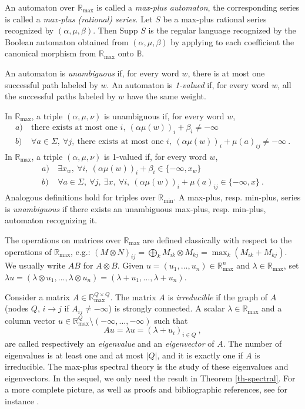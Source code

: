 \documentclass{article}
\newcommand{\supp}[1]{\text{Supp }#1}
\newcommand{\R} {\ensuremath{\mathbb{R}}}
\newcommand{\B} {\ensuremath{\mathbb{B}}}
\newcommand{\Rmin} {\R_{\min}}
\newcommand{\Rmax} {\R_{\max}}
\newcommand{\1}{\mathbb{1}}
\newcommand{\0}{\mathbb{0}}
\begin{document}
\medskip

An automaton over $\Rmax$ is called a {\em max-plus
automaton}, the corresponding series is called a {\em max-plus
(rational) series}.
Let $S$ be a max-plus
  rational series recognized by
$(\alpha,\mu,\beta)$. Then $\supp S$ is the regular language 
recognized
by the Boolean automaton obtained from $(\alpha,\mu,\beta)$ by
applying to each coefficient the canonical morphism from $\Rmax$ onto
$\B$. 

\medskip

An automaton is {\em unambiguous} if, for every word $w$,
there is at most one successful path labeled by $w$.
An automaton is {\em 1-valued} if, for every word $w$,
all the successful paths labeled by $w$ have the same weight.

In $\Rmax$, a triple $(\alpha,\mu,\nu)$ is unambiguous if, for every word $w$,
\begin{align*}
a) & \ \text{there exists at most one } i,\  (\alpha\mu(w))_i+\beta_i\neq -\infty\\
b) & \ \forall a\in\Sigma,\ \forall j, \ \text{there exists at most
  one }
i,\ (\alpha\mu(w))_i+\mu(a)_{ij}\neq -\infty \:.
\end{align*}
In $\Rmax$, a triple $(\alpha,\mu,\nu)$ is 1-valued if,
for every word $w$,
\begin{align*}
a) & \ \exists x_w,\ \forall i,\  (\alpha\mu(w))_i+\beta_i\in\{-\infty,x_w\}\\
b) & \ \forall a\in\Sigma,\ \forall j,\ \exists x,\ \forall i,\
(\alpha\mu(w))_i+\mu(a)_{ij}\in\{-\infty,x\}\:. 
\end{align*}
Analogous definitions hold for triples over $\Rmin$. 
A max-plus, resp. min-plus, series is {\em unambiguous} if there exists 
an unambiguous max-plus, resp. min-plus, automaton recognizing it.

\medskip

The operations on matrices over $\Rmax$ are defined classically
with respect to the operations of $\Rmax$, e.g.:
$(M\otimes N)_{ij}=\bigoplus_k M_{ik}\otimes
M_{kj}=\max_k(M_{ik}+M_{kj})$. We usually write $AB$ for $A\otimes B$. 
Given $u=(u_1,\dots , u_n) \in \Rmax^n$ and $\lambda \in \Rmax$, set $\lambda u
= (\lambda \otimes u_1,\dots , \lambda\otimes u_n)= (\lambda +
u_1,\dots , \lambda + u_n)$. 

\medskip

Consider a matrix $A\in \Rmax^{Q\times Q}$. The matrix $A$ is {\em
  irreducible} if the graph of $A$ (nodes $Q$, $i\rightarrow j$ if
  $A_{ij}\neq -\infty$) is strongly connected. A  scalar $\lambda\in \Rmax$
and a column vector $u \in \Rmax^Q
\setminus (-\infty,\dots, -\infty)$ such that 
\[
A u = \lambda u = (\lambda+u_i)_{i\in Q}\:,
\]
are called respectively an {\em eigenvalue} and an {\em
  eigenvector} of $A$. 
The number of eigenvalues is at least one and at most
  $|Q|$, and it is exactly one if $A$ is irreducible. 
The max-plus spectral theory is the study of
  these eigenvalues and eigenvectors. 
In the sequel, we only need the result in Theorem \ref{th-spectral}.
For a more complete picture, as
  well as proofs and bibliographic references, see for instance \cite{BCOQ}. 
\end{document}
